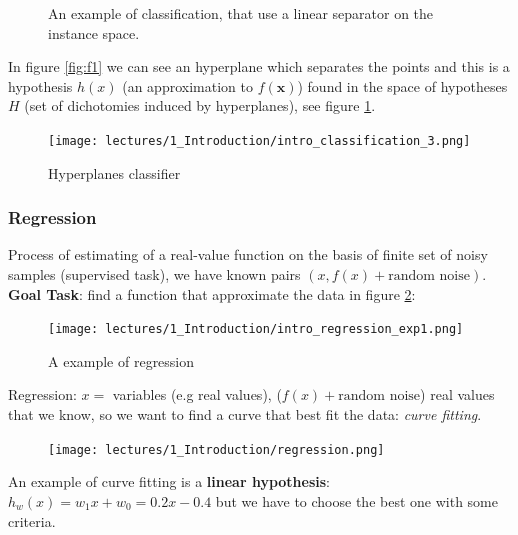 \documentclass[../main.tex]{subfiles}
\begin{document}
\begin{figure}[ht]
  \centering
  \hfill
  \caption{An example of classification, that use a linear separator on the instance space.}
\end{figure}
In figure \ref{fig:f1} we can see an hyperplane which separates the points and this is a hypothesis $h(x)$ (an approximation to $f(\mathbf{x})$) found in the space of hypotheses $H$ (set of dichotomies induced by hyperplanes), see figure \ref{fig:intro_classification_exp2}.
\begin{figure}[H]
    \centering
    \texttt{[image: lectures/1\_Introduction/intro\_classification\_3.png]}
    \caption{Hyperplanes classifier}
    \label{fig:intro_classification_exp2}
\end{figure}


\newpage
\subsubsection{Regression}
    Process of estimating of a real-value function on the basis of finite set of noisy samples (supervised task), we have known pairs $(x, f(x)+\text{random noise})$.\\
    \textbf{Goal Task}: find a function that approximate the data in figure \ref{fig:intro_regression_exp1}:
    \begin{figure}[H]
        \centering
        \texttt{[image: lectures/1\_Introduction/intro\_regression\_exp1.png]}
        \caption{A example of regression }
        \label{fig:intro_regression_exp1}
    \end{figure}
    Regression: $x =$ variables (e.g real values), ($f(x)+\text{random noise}$) real values that we know, so we want to find a curve that best fit the data: \textit{curve fitting}.
    \begin{figure}[ht]
        \centering
        \texttt{[image: lectures/1\_Introduction/regression.png]}
    \end{figure}
    An example of curve fitting is a \textbf{linear hypothesis}: $h_w(x) = w_1x + w_0 = 0.2x-0.4$ but we have to choose the best one with some criteria.
\end{document}
